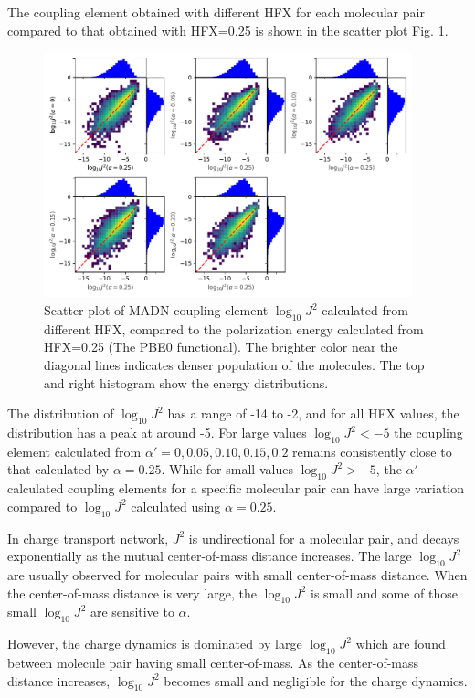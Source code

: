 \documentclass[letterpaper,12pt]{article}
\begin{document}
The coupling element obtained with different HFX for each molecular pair compared to that obtained with HFX=0.25 is shown in the scatter plot Fig. \ref{fig:J_MADN}.
\begin{figure}[H]
    \centering
    \includegraphics[width=0.95\textwidth]{figs/scatterJ_all.pdf}
    \caption{Scatter plot of MADN coupling element $\log_{10} J^2$ calculated from different HFX, compared to the polarization energy calculated from HFX=0.25 (The PBE0 functional). The brighter color near the diagonal lines indicates denser population of the molecules.  The top and right histogram show the energy distributions.}
    \label{fig:J_MADN}
\end{figure}

The distribution of $\log_{10} J^2$ has a range of -14 to -2, and for all HFX values, the distribution has a peak at around -5. 
For large values $\log_{10} J^2 < -5$ the coupling element calculated from $\alpha'=0, 0.05, 0.10, 0.15, 0.2$ remains consistently close to that calculated by $\alpha=0.25$. While for small values $\log_{10} J^2 > -5$, the $\alpha'$ calculated coupling elements for a specific molecular pair can have large variation compared to $\log_{10} J^2$ calculated using $\alpha=0.25$.

In charge transport network, $J^2$ is undirectional for a molecular pair, and decays exponentially as the mutual center-of-mass distance increases. The large $\log_{10} J^2$ are usually observed for molecular pairs with small center-of-mass distance. 
When the center-of-mass distance is very large, the $\log_{10} J^2$ is small and some of those small $\log_{10} J^2$ are sensitive to $\alpha$. 

However, the charge dynamics is dominated by large $\log_{10} J^2$ which are found between molecule pair having small center-of-mass. As the center-of-mass distance increases, $\log_{10} J^2$ becomes small and negligible for the charge dynamics.
\end{document}
